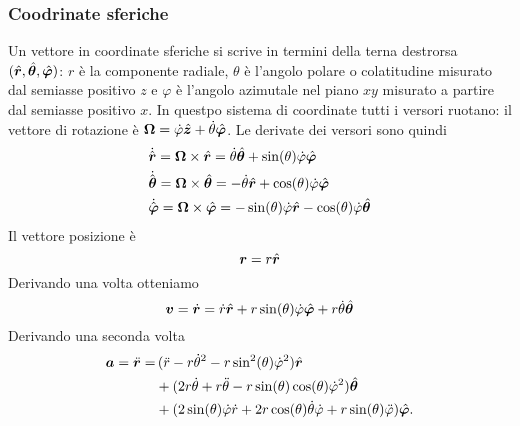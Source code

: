 \subsubsection{Coodrinate sferiche}
Un vettore in coordinate sferiche si scrive in termini della terna destrorsa $ (\hat{\boldsymbol{r}}, \hat{\boldsymbol{\theta}}, \hat{\boldsymbol{\varphi}}) $: $ r $ è la componente radiale, $ \theta $ è l'angolo polare o colatitudine misurato dal semiasse positivo $ z $ e $ \varphi $ è l'angolo azimutale nel piano $ xy $ misurato a partire dal semiasse positivo $ x $. In questpo sistema di coordinate tutti i versori ruotano: il vettore di rotazione è $ \boldsymbol{\Omega} = \dot \varphi \hat{\boldsymbol{z}} + \dot \theta \hat{\boldsymbol{\varphi}} $. Le derivate dei versori sono quindi
\begin{align*}
& \dot{\hat{\boldsymbol{r}}} = \boldsymbol{\Omega} \times \hat{\boldsymbol{r}} = \dot \theta \hat{\boldsymbol{\theta}} + \sin(\theta) \dot \varphi \hat{\boldsymbol{\varphi}} \\
& \dot{\hat{\boldsymbol{\theta}}} = \boldsymbol{\Omega} \times \hat{\boldsymbol{\theta}} = - \dot \theta \hat{\boldsymbol{r}} + \cos(\theta) \dot \varphi \hat{\boldsymbol{\varphi}}\\
& \dot{\hat{\boldsymbol{\varphi}}} = \boldsymbol{\Omega} \times \hat{\boldsymbol{\varphi}} = - \sin(\theta) \dot \varphi \hat{\boldsymbol{r}} - \cos(\theta) \dot \varphi \hat{\boldsymbol{\theta}} \\
\end{align*}
Il vettore posizione è
\begin{equation}
\boldsymbol{r} = r \hat{\boldsymbol{r}}
\end{equation}
Derivando una volta otteniamo
\begin{equation}
\boldsymbol{v} = \dot{\boldsymbol{r}} = \dot r \hat{\boldsymbol{r}} + r \sin(\theta) \dot \varphi \hat{\boldsymbol{\varphi}} + r \dot \theta \hat{\boldsymbol{\theta}} 
\end{equation}
Derivando una seconda volta
\begin{align}
\boldsymbol{a} = \ddot{\boldsymbol{r}} = & \, (\ddot r - r \dot \theta^2 - r \sin^2(\theta) \dot \varphi^2) \hat{\boldsymbol{r}} \\
& + (2 r \dot \theta + r \ddot \theta - r \sin(\theta) \cos(\theta) \dot \varphi^2) \hat{\boldsymbol{\theta}} \\
& + (2 \sin(\theta) \dot \varphi \dot r + 2 r \cos(\theta) \dot \theta \dot \varphi + r \sin(\theta) \ddot \varphi) \hat{\boldsymbol{\varphi}}.
\end{align}



